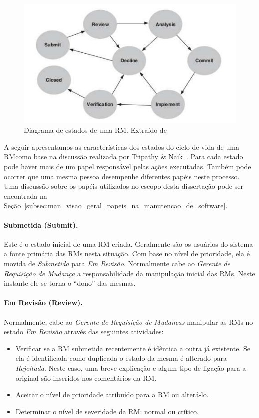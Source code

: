 \begin{figure}[htpb]
	\centering
	\includegraphics[width=0.5\linewidth]{./chapter-manutencao-software-visao-geral/img/diagrama-estado-rm.pdf}
	\caption{Diagrama de estados de uma RM\@. Extraído
		de~\cite{tripathy2014software}}
\label{fig:diagrama-estado-rm}
\end{figure}

A seguir apresentamos as características dos estados do ciclo de vida de uma
RM\@ como base na discussão realizada por Tripathy \&
Naik~\cite{tripathy2014software}. Para cada estado pode haver mais de um papel
responsável pelas ações executadas. Também pode ocorrer que uma mesma pessoa
desempenhe diferentes papéis neste processo. Uma discussão sobre os papéis
utilizados no escopo desta dissertação pode ser encontrada na
Seção~\ref{subsec:man_visao_geral_papeis_na_manutencao_de_software}.

\paragraph{Submetida (Submit).}
\label{par:submetida)}

Este é o estado inicial de uma RM criada. Geralmente são os usuários do sistema
a fonte primária das RMs nesta situação. Com base no nível de prioridade, ela é
movida de \textit{Submetida} para \textit{Em Revisão}. Normalmente cabe ao
\textit{Gerente de Requisição de Mudança} a responsabilidade da manipulação
inicial das RMs. Neste instante ele se torna o ``dono'' das mesmas.

\paragraph{Em Revisão (Review).}
\label{par:em_revisao}
Normalmente, cabe ao \textit{Gerente de Requisição de Mudanças} manipular as
RMs no estado \textit{Em Revisão} através das seguintes atividades:

\begin{itemize}
    \item Verificar se a RM submetida recentemente é idêntica a outra já
        existente. Se ela é identificada como duplicada o estado da mesma é
        alterado para \textit{Rejeitada}. Neste caso, uma breve explicação e
        algum tipo de ligação para a original são inseridos nos comentários da
        RM\@.
	\item Aceitar o nível de prioridade atribuído para a RM ou alterá-lo.
	\item Determinar o nível de severidade da RM\@: normal ou crítico.
\end{itemize}

